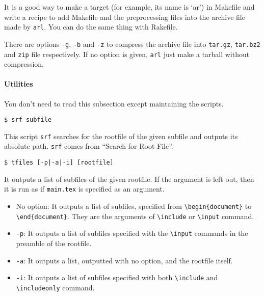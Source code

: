 It is a good way to make a target (for example, its name is `ar') in
Makefile and write a recipe to add Makefile and the preprocessing files
into the archive file made by \texttt{arl}. You can do the same thing
with Rakefile.

There are options \texttt{-g}, \texttt{-b} and \texttt{-z} to compress
the archive file into \texttt{tar.gz}, \texttt{tar.bz2} and \texttt{zip}
file respectively. If no option is given, \texttt{arl} just make a
tarball without compression.

\hypertarget{utilities}{%
\paragraph{Utilities}\label{utilities}}

You don't need to read this subsection except maintaining the scripts.

\begin{verbatim}
$ srf subfile
\end{verbatim}

This script \texttt{srf} searches for the rootfile of the given subfile
and outputs its absolute path. \texttt{srf} comes from ``Search for Root
File''.

\begin{verbatim}
$ tfiles [-p|-a|-i] [rootfile]
\end{verbatim}

It outputs a list of subfiles of the given rootfile. If the argument is
left out, then it is run as if \texttt{main.tex} is specified as an
argument.

\begin{itemize}
\tightlist
\item
  No option: It outputs a list of subfiles, specified from
  \texttt{\textbackslash{}begin\{document\}} to
  \texttt{\textbackslash{}end\{document\}}. They are the arguments of
  \texttt{\textbackslash{}include} or \texttt{\textbackslash{}input}
  command.
\item
  \texttt{-p}: It outputs a list of subfiles specified with the
  \texttt{\textbackslash{}input} commands in the preamble of the
  rootfile.
\item
  \texttt{-a}: It outputs a list, outputted with no option, and the
  rootfile itself.
\item
  \texttt{-i}: It outputs a list of subfiles specified with both
  \texttt{\textbackslash{}include} and
  \texttt{\textbackslash{}includeonly} command.
\end{itemize}

